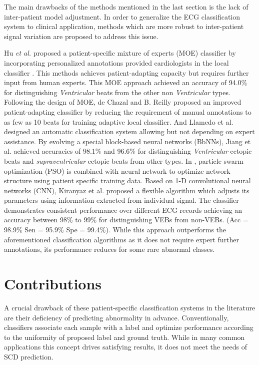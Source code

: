 The main drawbacks of the methods mentioned in the last section is the lack of inter-patient model adjustment. In order to generalize the ECG classification system to clinical application, methods which are more robust to inter-patient signal variation are proposed to address this issue\cite{Hu_et_al,deChazal2006,llamedo2012automatic,bbnn,ince2009generic,Kiranyaz}.

Hu \textit{et al.} proposed a patient-specific mixture of experts (MOE) classifier by incorporating personalized annotations provided cardiologists in the local classifier \cite{Hu_et_al}. This methods achieves patient-adapting capacity but requires further input from human experts. This MOE approach achieved an accuracy of 94.0\% for distinguishing \textit{Ventricular} beats from the other non \textit{Ventricular} types. Following the design of MOE, de Chazal and B. Reilly proposed an improved patient-adapting classifier by reducing the requirement of manual annotations to as few as 10 beats for training adaptive local classifier\cite{deChazal2006}. And Llamedo et al. designed an automatic classification system allowing but not depending on expert assistance\cite{llamedo2012automatic}. By evolving a special block-based neural networks (BbNNs), Jiang et al. achieved accuracies of 98.1\% and 96.6\% for distinguishing \textit{Ventricular} ectopic beats and \textit{supraventricular} ectopic beats from other types\cite{bbnn}. In \cite{ince2009generic}, particle swarm optimization (PSO) is combined with neural network to optimize network structure using patient specific training data. Based on 1-D convolutional neural networks (CNN), Kiranyaz et al. proposed a flexible algorithm which adjusts its parameters using information extracted from individual signal\cite{Kiranyaz}. The classifier demonstrates consistent performance over different ECG records achieving an accuracy between 98\% to 99\% for distinguishing VEBs from non-VEBs. (Acc = 98.9\%  Sen = 95.9\% Spe =  99.4\%). While this approach outperforms the aforementioned classification algorithms as it does not require expert further annotations, its performance reduces for some rare abnormal classes. 
 
\section{Contributions}

A crucial drawback of these patient-specific classification systems in the literature are their deficiency of predicting abnormality in advance. Conventionally, classifiers associate each sample with a label and optimize performance according to the uniformity of proposed label and ground truth. While in many common applications this concept drives satisfying results, it does not meet the needs of SCD prediction. %

